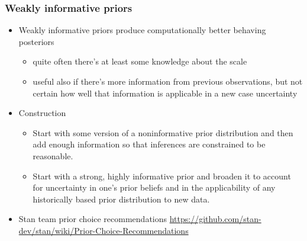 \documentclass[english,t]{beamer}
\begin{document}
\begin{frame}

  \frametitle{Weakly informative priors}

  \begin{itemize}
  \item Weakly informative priors produce computationally better
    behaving posteriors
    \begin{itemize}
    \item quite often there's at least some knowledge about the
      scale
    \item useful also if there's more information from previous
      observations, but not certain how well that information is
      applicable in a new case uncertainty
    \end{itemize}
    \pause
    \item Construction
      \begin{itemize}
      \item Start with some version of a noninformative prior distribution and then add enough
        information so that inferences are constrained to be reasonable.
      \item Start with a strong, highly informative prior and broaden it to account for uncertainty
        in one's prior beliefs and in the applicability of any historically based prior distribution
        to new data.
      \end{itemize}
    \item Stan team prior choice recommendations \url{https://github.com/stan-dev/stan/wiki/Prior-Choice-Recommendations}
  \end{itemize}

\end{frame}
\end{document}
